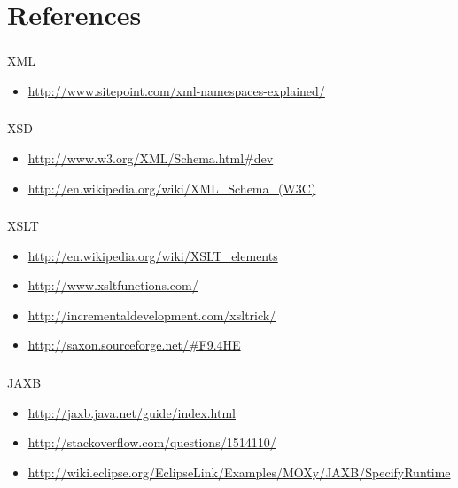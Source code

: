 \documentclass[handout]{beamer}
\begin{document}
\section{References}

\begin{frame}
	\frametitle{\insertsection}
	XML\\
	\begin{itemize}
		\item \url{http://www.sitepoint.com/xml-namespaces-explained/}{}
	\end{itemize}
\end{frame}

\begin{frame}
	\frametitle{\insertsection}
	XSD\\
	\begin{itemize}
		\item \url{http://www.w3.org/XML/Schema.html\#dev}{}
		\item \url{http://en.wikipedia.org/wiki/XML_Schema_(W3C)}{}
	\end{itemize}
\end{frame}

\begin{frame}
	\frametitle{\insertsection}
	XSLT\\
	\begin{itemize}
		\item \url{http://en.wikipedia.org/wiki/XSLT_elements}{}
		\item \url{http://www.xsltfunctions.com/}{}
		\item \url{http://incrementaldevelopment.com/xsltrick/}{}
		\item \url{http://saxon.sourceforge.net/\#F9.4HE}{}
	\end{itemize}
\end{frame}

\begin{frame}
	\frametitle{\insertsection}
	JAXB\\
	\begin{itemize}
		\item \url{http://jaxb.java.net/guide/index.html}
		\item \url{http://stackoverflow.com/questions/1514110/}
		\item \url{http://wiki.eclipse.org/EclipseLink/Examples/MOXy/JAXB/SpecifyRuntime}
	\end{itemize}
\end{frame}
\end{document}
